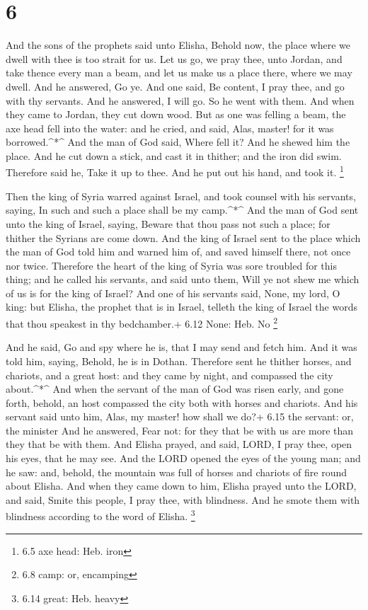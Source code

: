 \hypertarget{section-5}{%
\section{6}\label{section-5}}

 And the sons of the prophets said unto Elisha, Behold now,
the place where we dwell with thee is too strait for us. 
Let us go, we pray thee, unto Jordan, and take thence every man a beam,
and let us make us a place there, where we may dwell. And he answered,
Go ye.  And one said, Be content, I pray thee, and go with
thy servants. And he answered, I will go.  So he went with
them. And when they came to Jordan, they cut down wood.  But
as one was felling a beam, the axe head fell into the water: and he
cried, and said, Alas, master! for it was borrowed.\^{}*\^{}
 And the man of God said, Where fell it? And he shewed him
the place. And he cut down a stick, and cast it in thither; and the iron
did swim.  Therefore said he, Take it up to thee. And he put
out his hand, and took it. \footnote{6.5 axe head: Heb. iron}

 Then the king of Syria warred against Israel, and took
counsel with his servants, saying, In such and such a place shall be my
camp.\^{}*\^{}  And the man of God sent unto the king of
Israel, saying, Beware that thou pass not such a place; for thither the
Syrians are come down.  And the king of Israel sent to the
place which the man of God told him and warned him of, and saved himself
there, not once nor twice.  Therefore the heart of the king
of Syria was sore troubled for this thing; and he called his servants,
and said unto them, Will ye not shew me which of us is for the king of
Israel?  And one of his servants said, None, my lord, O
king: but Elisha, the prophet that is in Israel, telleth the king of
Israel the words that thou speakest in thy bedchamber.+ 6.12 None: Heb.
No \footnote{6.8 camp: or, encamping}

 And he said, Go and spy where he is, that I may send and
fetch him. And it was told him, saying, Behold, he is in Dothan.
 Therefore sent he thither horses, and chariots, and a
great host: and they came by night, and compassed the city
about.\^{}*\^{}  And when the servant of the man of God was
risen early, and gone forth, behold, an host compassed the city both
with horses and chariots. And his servant said unto him, Alas, my
master! how shall we do?+ 6.15 the servant: or, the minister
 And he answered, Fear not: for they that be with us are
more than they that be with them.  And Elisha prayed, and
said, LORD, I pray thee, open his eyes, that he may see. And the LORD
opened the eyes of the young man; and he saw: and, behold, the mountain
was full of horses and chariots of fire round about Elisha.
 And when they came down to him, Elisha prayed unto the
LORD, and said, Smite this people, I pray thee, with blindness. And he
smote them with blindness according to the word of Elisha. \footnote{6.14
  great: Heb. heavy}

